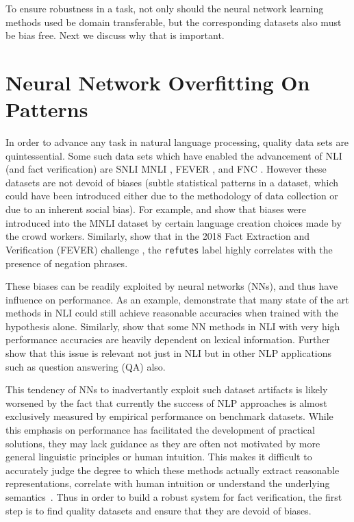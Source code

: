 To ensure robustness in a task, not only should the neural network learning methods used be domain transferable, but the corresponding datasets also must be bias free. Next we discuss why that is important.

\section{Neural Network Overfitting On Patterns}

 In order to advance any task in natural language processing, quality data sets are quintessential. Some such data sets which have enabled the advancement of NLI (and fact verification) are SNLI \citep{bowman2015large} MNLI \citep{williams2017broad}, FEVER \citep{thorne2018fever}, and FNC \citep{pomerleau2017fake}. However these datasets are not devoid of biases (subtle statistical patterns in a dataset, which could have been introduced either due to the methodology of data collection or due to an inherent social bias). 
For example, \citep{gururangan2018annotation} and \citep{poliak2018hypothesis} show that biases were introduced into the MNLI dataset by certain language creation choices made by the crowd workers. Similarly, \citep{schuster2019towards} show that in the 2018 Fact Extraction and Verification (FEVER) challenge \citep{thorne2018fever}, the \texttt{refutes} label highly correlates with the presence of negation phrases. 

These biases can be readily exploited by neural networks (NNs), and thus have influence on performance.  As an example, \citep{gururangan2018annotation} demonstrate that many state of the art methods in NLI could still achieve reasonable accuracies when trained with the hypothesis alone. Similarly, \citep{emnlp2019sandeep} show that some NN methods in NLI with very high performance accuracies are heavily dependent on lexical information. Further ~\citep{yadav2019alignment} show that this issue is relevant not just in NLI but in other NLP applications such as question answering (QA) also.


This tendency of NNs to inadvertantly exploit such dataset artifacts is likely worsened by the fact that currently the success of NLP approaches is almost exclusively measured by empirical performance on benchmark datasets. While this emphasis on performance has facilitated the development of practical solutions, they may lack guidance as they are often not motivated by more general linguistic principles or human intuition. This makes it difficult to accurately judge the degree to which these methods actually extract reasonable representations, correlate with  human intuition or understand the underlying semantics~\citep{dagan2013recognizing}. Thus in order to build a robust system for fact verification, the first step is to find quality datasets and ensure that they are devoid of biases. 
 
